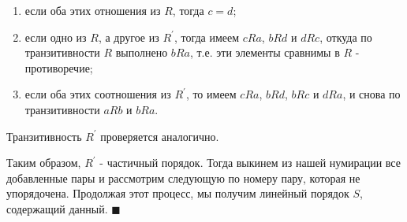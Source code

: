 \begin{enumerate}
    \item если оба этих отношения из $R$, тогда $c=d$;
    \item если одно из $R$, а другое из $R^\prime$, тогда имеем $cRa$, $bRd$ и $dRc$, откуда по транзитивности $R$ выполнено $bRa$, т.е. эти элементы сравнимы в $R$ - противоречие;
    \item если оба этих соотношения из $R^\prime$, то имеем $cRa$, $bRd$, $bRc$ и $dRa$, и снова по транзитивности $aRb$ и $bRa$.
\end{enumerate}
Транзитивность $R^\prime$ проверяется аналогично.
\par Таким образом, $R^\prime$ - частичный порядок. Тогда выкинем из нашей нумирации все добавленные пары и рассмотрим следующую по номеру пару, которая не упорядочена. Продолжая этот процесс, мы получим линейный порядок $S$, содержащий данный. $\blacksquare$